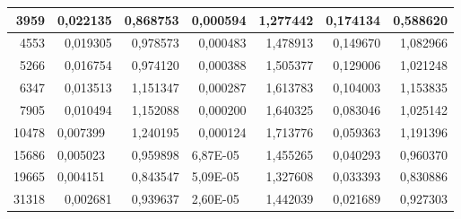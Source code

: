 \documentclass[14pt]{article}
\begin{document}
\begin{table}[H]
\begin{tabular}{|r|r|r|r|r|r|r|}
3959                    & 0,022135                         & 0,868753                  & 0,000594                      & 1,277442                  & 0,174134                    & 0,588620                    \\ \hline
4553                    & 0,019305    & 0,978573                  & 0,000483                      & 1,478913                  & 0,149670                    & 1,082966                    \\ \hline
5266                    & 0,016754                         & 0,974120                  & 0,000388                      & 1,505377                  & 0,129006                    & 1,021248                    \\ \hline
6347                    & 0,013513                         & 1,151347                  & 0,000287                      & 1,613783                  & 0,104003                    & 1,153835                    \\ \hline
7905                    & 0,010494 & 1,152088                  & 0,000200                      & 1,640325                  & 0,083046                    & 1,025142                    \\ \hline
10478                   & \multicolumn{1}{l|}{0,007399} & 1,240195                  & 0,000124                      & 1,713776                  & 0,059363                    & 1,191396                    \\ \hline
15686                   & \multicolumn{1}{l|}{0,005023} & 0,959898                  & \multicolumn{1}{l|}{6,87E-05} & 1,455265                  & 0,040293                    & 0,960370                    \\ \hline
19665                   & \multicolumn{1}{l|}{0,004151} & 0,843547                  & \multicolumn{1}{l|}{5,09E-05} & 1,327608                  & 0,033393                    & 0,830886                    \\ \hline
31318                   & 0,002681                         & 0,939637                  & \multicolumn{1}{l|}{2,60E-05} & 1,442039                  & 0,021689                    & 0,927303                    \\ \hline
\end{tabular}

\end{table}
\end{document}

